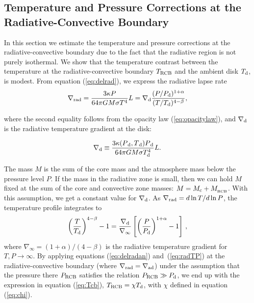 \documentclass[apj]{emulateapj}
\newcommand{\delad}{\nabla_{\rm ad}}
\newcommand{\delrad}{\nabla_{\rm rad}}
\newcommand{\Eqs}[2]{equations (\ref{#1}) and~(\ref{#2})}
\newcommand{\co}{_{\rm c}}
\newcommand{\di}{_{\rm d}}
\newcommand{\cb}{_{\rm RCB}}
\begin{document}
\subsection{Temperature and Pressure Corrections at the Radiative-Convective Boundary}
\label{RCBcorr}

In this section we estimate the temperature and pressure corrections at the radiative-convective boundary due to the fact that the radiative region is not purely isothermal. We show that the temperature contrast between the temperature at the radiative-convective boundary $T_{\rm RCB}$ and the ambient disk $T_{\rm d}$, is modest.  From equation (\ref{eq:delrad}), we express the radiative lapse rate
\begin{equation}\label{eq:delradan}
\delrad = {3 \kappa P \over 64 \pi  G M \sigma T^4} L = \nabla\di {(P/P_{\rm d})^{1+\alpha} \over (T/T_{\rm d})^{4-\beta}},
\end{equation}

\noindent where the second equality follows from the opacity law (\ref{eq:opacitylaw}), and $\nabla_{\rm d}$ is the radiative temperature gradient at the disk:

\begin{equation}
\label{eq:delo}
\nabla \di \equiv \frac{3 \kappa(P{\di}, T{\di}) P{\di}}{64 \pi G M \sigma T_{\rm d}^4} L.
\end{equation}

\noindent The mass $M$ is the sum of the core mass and the atmosphere mass below the pressure level $P$.  If the mass in the radiative zone is small, then we can hold $M$ fixed at the sum of the core and convective zone masses: $M = M\co + M_{\cb}$.   With this assumption, we get a constant value for $\nabla_{\rm d}$.  As $\delrad=d \ln T/d \ln P$, the temperature profile integrates to
\begin{equation}\label{eq:radTP}
\left(T \over T_{\rm d}\right)^{4-\beta} - 1 = {\nabla\di \over \nabla_\infty} \left[\left({P \over P_{\rm d}}\right)^{1+\alpha} - 1 \right] \, ,
\end{equation} 
where $\nabla_\infty = (1+\alpha)/(4-\beta)$ is the radiative temperature gradient for $T ,P \rightarrow \infty$.
By applying \Eqs{eq:delradan}{eq:radTP} at the radiative-convective boundary (where $\delrad = \delad$) under the assumption that the pressure there $P\cb$ satisfies the relation $P\cb \gg P_{\rm d}$, we end up with the expression in equation (\ref{eq:Tcb}), $T\cb=\chi T\di$, with $\chi$ defined in equation (\ref{eq:chi}).
\end{document}
